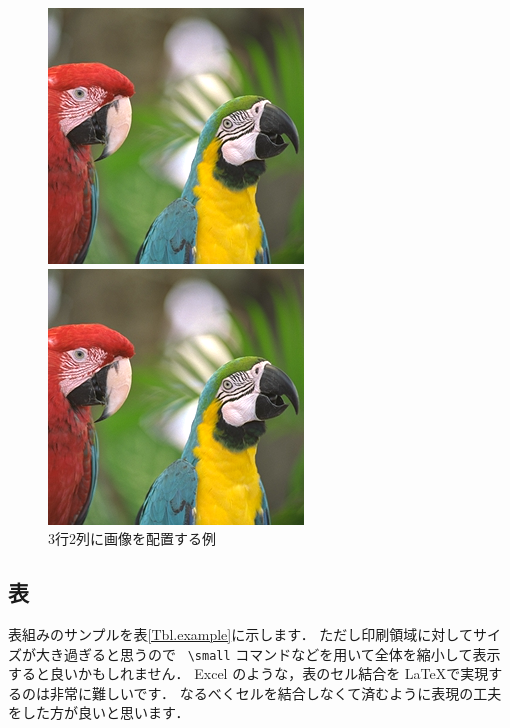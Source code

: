 \documentclass[dvipdfmx,report,disablejfam,nosetpagesize,12pt]{jsbook}
\begin{document}
\begin{figure}[p]
\begin{minipage}[c]{.47\hsize}
      \includegraphics[width=.8\hsize]{figure/example-png.png}
   \end{minipage}
   \begin{minipage}[c]{.47\hsize}
      \centering
      \includegraphics[width=.8\hsize]{figure/example-png.png}
   \end{minipage}
   \caption{3行2列に画像を配置する例}
   \label{Fig.example-3x2-grid}
\end{figure}

\subsection{表}
表組みのサンプルを表\ref{Tbl.example}に示します．
ただし印刷領域に対してサイズが大き過ぎると思うので
\ \verb+\small+ コマンドなどを用いて全体を縮小して表示すると良いかもしれません．
Excel のような，表のセル結合を \LaTeX で実現するのは非常に難しいです．
なるべくセルを結合しなくて済むように表現の工夫をした方が良いと思います．
\end{document}

